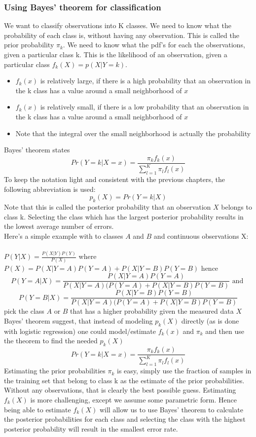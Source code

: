 {\renewcommand{\arraystretch}{1.5}
	\subsubsection{Using Bayes' theorem for classification}
	We want to classify observations into K classes. We need to know what the probability of each class is, without having any observation.
	This is called the prior probability $\pi_k$. We need to know what the pdf's for each the observations, given a particular class k.
	This is the likelihood of an observation, given a particular class $f_k(X)=p(X|Y=k)$.
	\begin{itemize}
		\item $f_k(x)$ is relatively large, if there is a high probability that an observation in the k class has a value around a small neighborhood of $x$
		\item $f_k(x)$ is relatively small, if there is a low probability that an observation in the k class has a value around a small neighborhood of $x$
		\item Note that the integral over the small neighborhood is actually the probability
	\end{itemize}
	Bayes' theorem states \[ Pr(Y=k|X=x)=\frac{\pi_kf_k(x)}{\sum_{l=1}^{K}\pi_lf_l(x)}\] 
	To keep the notation light and consistent with the previous chapters, the following abbreviation is used: 
	\[ p_k(X)=Pr(Y=k|X)\]
	Note that this is called the posterior probability that an observation $X$ belongs to class k.
	Selecting the class which has the largest posterior probability results in the lowest average number of errors. \\
	Here's a simple example with to classes $A$ and $B$ and continuous observations X: \\
	\\
	$P(Y|X)=\frac{P(X|Y)P(Y)}{P(X)}$ where $P(X)=P(X|Y=A)P(Y=A)+P(X|Y=B)P(Y=B)$ hence
	\[ P(Y=A|X)=\frac{P(X|Y=A)P(Y=A)}{P(X|Y=A)(P(Y=A)+P(X|Y=B)P(Y=B)} \text{ and } \]
	\[ P(Y=B|X)=\frac{P(X|Y=B)P(Y=B)}{P(X|Y=A)(P(Y=A)+P(X|Y=B)P(Y=B)} \] 
	pick the class $A$ or $B$ that has a higher probability given the measured data $X$ \\
	Bayes' theorem suggest, that instead of modeling $p_k(X)$ directly (as is done with logistic regression)
	one could model/estimate $f_k(x)$ and $\pi_k$ and then use the theorem to find the needed $p_k(X)$
	\[ Pr(Y=k|X=x)=\frac{\pi_kf_k(x)}{\sum_{l=1}^{K}\pi_lf_l(x)} \]
	Estimating the prior probabilities $\pi_k$ is easy, simply use the fraction of samples in the training set that belong
	to class k as the estimate of the prior probabilities. 
	Without any observations, that is clearly the best possible guess.
	Estimating $f_k(X)$ is more challenging, except we assume some parametric form. 
	Hence being able to estimate $f_k(X)$ will allow us to use Bayes' theorem to calculate the posterior probabilities
	for each class and selecting the class with the highest posterior probability will result in the smallest error rate.


}
